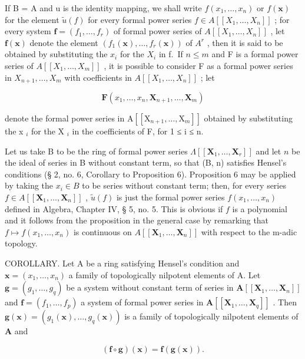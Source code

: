 If B = A and u is the identity mapping, we shall write \(f(x_{1}, \ldots, x_{n})\) or \(f(\mathbf{x})\) for the element \(\tilde{u}(f)\) for every formal power series \(f \in A[[X_{1}, \ldots, X_{n}]]\) ; for every system \(\mathbf{f} = (f_{1}, \ldots, f_{r})\) of formal power series of \(A[[X_{1}, \ldots, X_{n}]]\) , let \(\mathbf{f}(\mathbf{x})\) denote the element \((f_{1}(\mathbf{x}), \ldots, f_{r}(\mathbf{x}))\) of \(A^{r}\) , then it is said to be obtained by substituting the \(x_{i}\) for the \(X_{i}\) in f.~If \(n \leqslant m\) and F is a formal power series of \(A[[X_{1}, \ldots, X_{m}]]\) , it is possible to consider F as a formal power series in \(X_{n+1}, \ldots, X_{m}\) with coefficients in \(A[[X_{1}, \ldots, X_{n}]]\) ; let

\[
\mathbf {F} (x _ {1}, \dots , x _ {n}, \mathbf {X} _ {n + 1}, \dots , \mathbf {X} _ {m})
\]

denote the formal power series in \(\mathrm{A}[[\mathrm{X}_{n+1}, \ldots, \mathrm{X}_{m}]]\) obtained by substituting the x \(_{i}\) for the X \(_{i}\) in the coefficients of F, for 1 ≤ i ≤ n.

Let us take B to be the ring of formal power series \(\Lambda[[\mathbf{X}_1,\ldots,\mathbf{X}_r]]\) and let \(n\) be the ideal of series in B without constant term, so that (B, n) satisfies Hensel's conditions (§ 2, no. 6, Corollary to Proposition 6). Proposition 6 may be applied by taking the \(x_i \in B\) to be series without constant term; then, for every series \(f \in A[[\mathbf{X}_1,\ldots,\mathbf{X}_n]]\) , \(\tilde{u}(f)\) is just the formal power series \(f(x_1,\ldots,x_n)\) defined in Algebra, Chapter IV, § 5, no. 5. This is obvious if \(f\) is a polynomial and it follows from the proposition in the general case by remarking that \(f \mapsto f(x_1,\ldots,x_n)\) is continuous on \(A[[\mathbf{X}_1,\ldots,\mathbf{X}_n]]\) with respect to the m-adic topology.

COROLLARY. Let A be a ring satisfying Hensel's condition and \(\mathbf{x} = (x_{1},\ldots ,x_{n})\) a family of topologically nilpotent elements of A. Let \(\mathbf{g} = (g_1,\dots,g_q)\) be a system without constant term of series in \(\mathbf{A}[[\mathbf{X}_1,\ldots ,\mathbf{X}_n]]\) and \(\mathbf{f} = (f_1,\dots,f_p)\) a system of formal power series in \(\mathbf{A}[[\mathbf{X}_1,\dots,\mathbf{X}_q]]\) . Then \(\mathbf{g}(\mathbf{x}) = (g_1(\mathbf{x}),\dots,g_q(\mathbf{x}))\) is a family of topologically nilpotent elements of \(\mathbf{A}\) and

\[
(\mathbf {f} \circ \mathbf {g}) (\mathbf {x}) = \mathbf {f} (\mathbf {g} (\mathbf {x})).\tag{18}
\]


